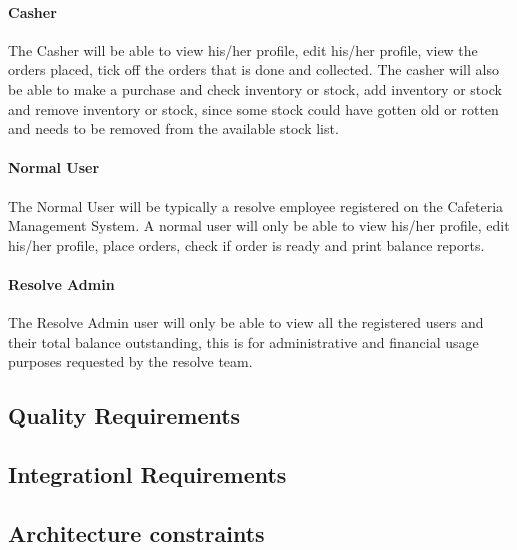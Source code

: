 \documentclass[12pt]{article}
\begin{document}
\paragraph{ Casher\\}
The Casher will be able to view his/her profile, edit his/her profile,  view the orders placed, tick off the orders that is done and collected. The casher will also be able to make a purchase and check inventory or stock, add inventory or stock and remove inventory or stock, since some stock could have gotten old or rotten and needs to be removed from the available stock list. 

\paragraph{ Normal User\\}
The Normal User will be typically a resolve employee registered on the Cafeteria Management System.  A normal user will only be able to view his/her profile, edit his/her profile, place orders, check if order is ready and print balance reports.

\paragraph{ Resolve Admin\\}
The Resolve Admin user will only be able to view all the registered users and their total balance outstanding, this is for administrative and financial usage purposes requested by the resolve team.




\subsection{Quality Requirements}

\subsection{Integrationl Requirements}

\subsection{Architecture constraints}

\end{document}
